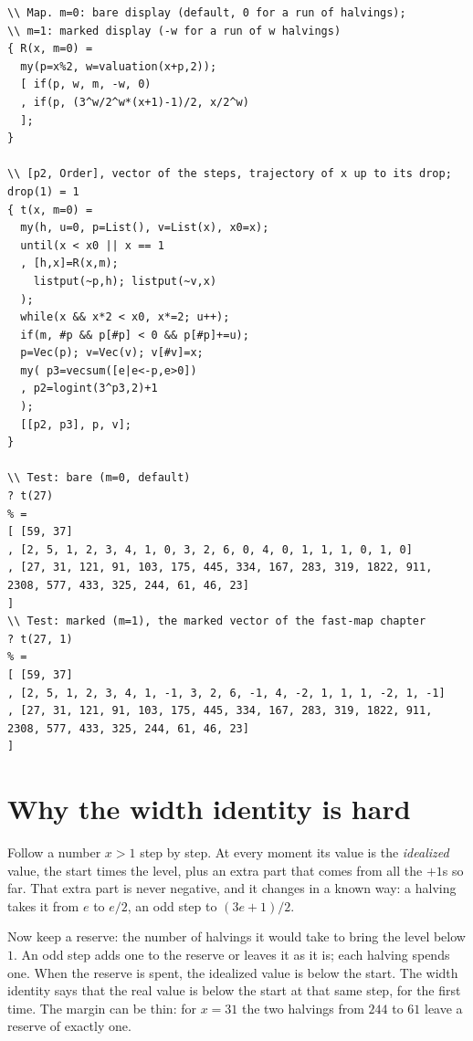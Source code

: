 \documentclass[11pt,a4paper,titlepage]{article}
\begin{document}
\begin{lstlisting}[basicstyle=\ttfamily\scriptsize, breaklines=true]
\\ Map. m=0: bare display (default, 0 for a run of halvings);
\\ m=1: marked display (-w for a run of w halvings)
{ R(x, m=0) =
  my(p=x%2, w=valuation(x+p,2));
  [ if(p, w, m, -w, 0)
  , if(p, (3^w/2^w*(x+1)-1)/2, x/2^w)
  ];
}

\\ [p2, Order], vector of the steps, trajectory of x up to its drop; drop(1) = 1
{ t(x, m=0) =
  my(h, u=0, p=List(), v=List(x), x0=x);
  until(x < x0 || x == 1
  , [h,x]=R(x,m);
    listput(~p,h); listput(~v,x)
  );
  while(x && x*2 < x0, x*=2; u++);
  if(m, #p && p[#p] < 0 && p[#p]+=u);
  p=Vec(p); v=Vec(v); v[#v]=x;
  my( p3=vecsum([e|e<-p,e>0])
  , p2=logint(3^p3,2)+1
  );
  [[p2, p3], p, v];
}

\\ Test: bare (m=0, default)
? t(27)
% =
[ [59, 37]
, [2, 5, 1, 2, 3, 4, 1, 0, 3, 2, 6, 0, 4, 0, 1, 1, 1, 0, 1, 0]
, [27, 31, 121, 91, 103, 175, 445, 334, 167, 283, 319, 1822, 911, 2308, 577, 433, 325, 244, 61, 46, 23]
]
\\ Test: marked (m=1), the marked vector of the fast-map chapter
? t(27, 1)
% =
[ [59, 37]
, [2, 5, 1, 2, 3, 4, 1, -1, 3, 2, 6, -1, 4, -2, 1, 1, 1, -2, 1, -1]
, [27, 31, 121, 91, 103, 175, 445, 334, 167, 283, 319, 1822, 911, 2308, 577, 433, 325, 244, 61, 46, 23]
]
\end{lstlisting}


\section{Why the width identity is hard}
\label{app:width}

Follow a number $x > 1$ step by step. At every moment its value is the
\emph{idealized} value, the start times the level, plus an extra part that
comes from all the $+1$s so far. That extra part is never negative, and it
changes in a known way: a halving takes it from $e$ to $e/2$, an odd step to
$(3e+1)/2$.

Now keep a reserve: the number of halvings it would take to bring the level
below $1$. An odd step adds one to the reserve or leaves it as it is; each
halving spends one. When the reserve is spent, the idealized value is below the
start. The width identity says that the real value is below the start at that same
step, for the first time. The margin can be thin: for $x = 31$ the two halvings
from $244$ to $61$ leave a reserve of exactly one.
\end{document}
